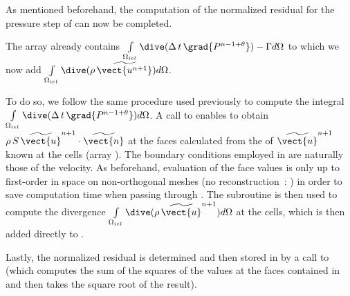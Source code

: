 
As mentioned beforehand, the computation of the normalized residual for the pressure step of  can now be completed.

The  array already contains
$\int\limits_{\Omega_{iel}}{\dive(\Delta\,t\,\grad{P^{n-1+\theta}}) -\Gamma d\Omega}$ to which we now add
$\int\limits_{\Omega_{iel}}{\dive(\rho\,\widetilde{\vect{u^{n+1}}})d\Omega}$.

To do so, we follow the same procedure used previously to compute the integral
$\int\limits_{\Omega_{iel}}{\dive(\Delta\,t\,\grad{P^{n-1+\theta}}) d\Omega}$. A call to
 enables to obtain
$\rho\,S\,\widetilde{\vect{u}}^{n+1}\cdot\widetilde{\vect{n}}$ at the faces calculated from the of
$\widetilde{\vect{u}}^{n+1}$ known at the cells (array ). The boundary conditions
employed in  are naturally those of the velocity. As beforehand, evaluation of the face values is only up to first-order in space on non-orthogonal meshes (no reconstruction~: ) in order to save computation time when passing through . The subroutine  is then used to compute the divergence $\int\limits_{\Omega_{iel}}{\dive(\rho\,\widetilde{\vect{u}}^{n+1})d\Omega}$ at the cells, which is then added directly to .

Lastly, the normalized residual is determined and then stored in  by a call to   (which computes the sum of the squares of the values at the faces contained in  and then takes the square root of the result).\\


\newpage

